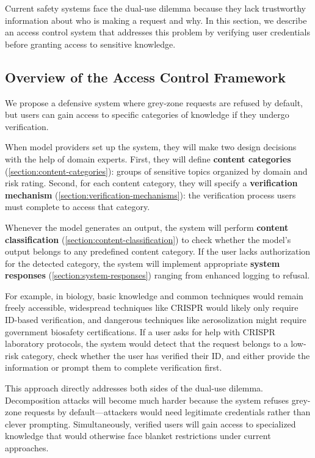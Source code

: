 \documentclass{article}
\theoremstyle{plain}
\theoremstyle{definition}
\theoremstyle{remark}
\begin{document}
Current safety systems face the dual-use dilemma because they lack trustworthy information about who is making a request and why.
In this section, we describe an access control system that addresses this problem by verifying user credentials before granting access to sensitive knowledge.

\subsection{Overview of the Access Control Framework}

We propose a defensive system where grey-zone requests are refused by default, but users can gain access to specific categories of knowledge if they undergo verification.

When model providers set up the system, they will make two design decisions with the help of domain experts.
First, they will define \textbf{content categories} (\cref{section:content-categories}): groups of sensitive topics organized by domain and risk rating.
Second, for each content category, they will specify a \textbf{verification mechanism} (\cref{section:verification-mechanisms}): the verification process users must complete to access that category.

Whenever the model generates an output, the system will perform \textbf{content classification} (\cref{section:content-classification}) to check whether the model's output belongs to any predefined content category.
If the user lacks authorization for the detected category, the system will implement appropriate \textbf{system responses} (\cref{section:system-responses}) ranging from enhanced logging to refusal.

For example, in biology, basic knowledge and common techniques would remain freely accessible, widespread techniques like CRISPR would likely only require ID-based verification, and dangerous techniques like aerosolization might require government biosafety certifications.
If a user asks for help with CRISPR laboratory protocols, the system would detect that the request belongs to a low-risk category, check whether the user has verified their ID, and either provide the information or prompt them to complete verification first.

This approach directly addresses both sides of the dual-use dilemma.
Decomposition attacks will become much harder because the system refuses grey-zone requests by default—attackers would need legitimate credentials rather than clever prompting.
Simultaneously, verified users will gain access to specialized knowledge that would otherwise face blanket restrictions under current approaches.
\end{document}
